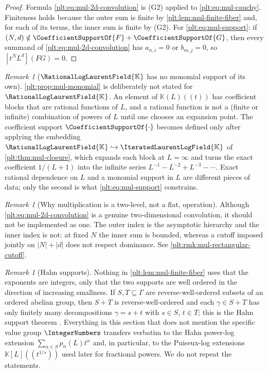 \documentclass[11pt,oneside]{article}
\theoremstyle{plain}
\theoremstyle{definition}
\theoremstyle{remark}
\newtheorem{remark}[theorem]{Remark}
\newcommand{\K}{\mathbb{K}}
\newcommand{\PLrat}{\RationalLogLaurentField{\K}}        %
\newcommand{\PLit}{\IteratedLaurentLogField{\K}}         %
\begin{document}
\begin{proof}
Formula \eqref{plt:eq:mul-2d-convolution} is (G2) applied to
\eqref{plt:eq:mul-cauchy}.  Finiteness holds because the outer sum is finite
by \cref{plt:lem:mul-finite-fiber} and, for each of its terms, the inner sum
is finite by (G2).  For \eqref{plt:eq:mul-support}: if
$(N,d)\notin\CoefficientSupportOf{F}+\CoefficientSupportOf{G}$, then every
summand of \eqref{plt:eq:mul-2d-convolution} has $a_{n,i}=0$ or $b_{m,j}=0$,
so $[t^NL^d](FG)=0$.
\end{proof}

\begin{remark}[$\PLrat$ has no monomial support of its own]
\label{plt:rmk:mul-rat-no-support}
\cref{plt:prop:mul-monomial} is deliberately not stated for $\PLrat$.  An
element of $\K(L)((t))$ has coefficient blocks that are rational functions of
$L$, and a rational function is not a (finite or infinite) combination of
powers of $L$ until one chooses an expansion point.  The coefficient support
$\CoefficientSupportOf{\cdot}$ becomes defined only after applying the
embedding $\PLrat\hookrightarrow\PLit$ of \cref{plt:thm:mul-closure}, which
expands each block at $L=\infty$ and turns the exact coefficient $1/(L+1)$
into the infinite series $L^{-1}-L^{-2}+L^{-3}-\cdots$.  Exact rational
dependence on $L$ and a monomial support in $L$ are different pieces of data;
only the second is what \eqref{plt:eq:mul-support} constrains.
\end{remark}

\begin{remark}[Why multiplication is a two-level, not a flat, operation]
\label{plt:rmk:mul-two-level}
Although \eqref{plt:eq:mul-2d-convolution} is a genuine two-dimensional
convolution, it should not be implemented as one.  The outer index is the
asymptotic hierarchy and the inner index is not: at fixed $N$ the inner sum
is bounded, whereas a cutoff imposed jointly on $|N|+|d|$ does not respect
dominance.  See \cref{plt:rmk:mul-rectangular-cutoff}.
\end{remark}

\begin{remark}[Hahn supports]
\label{plt:rmk:mul-hahn}
Nothing in \cref{plt:lem:mul-finite-fiber} uses that the exponents are
integers, only that the two supports are well ordered in the direction of
increasing smallness.  If $S,T\subseteq\Gamma$ are reverse-well-ordered
subsets of an ordered abelian group, then $S+T$ is reverse-well-ordered and
each $\gamma\in S+T$ has only finitely many decompositions $\gamma=s+t$ with
$s\in S$, $t\in T$; this is the Hahn support theorem
\cite{hahn,edgar-beginners}.  Everything in this section that does not
mention the specific value group $\IntegerNumbers$ transfers verbatim to the
Hahn power-log extension $\sum_{\alpha\in S}p_\alpha(L)t^\alpha$ and, in
particular, to the Puiseux-log extensions $\K[L]((t^{1/s}))$ used later for
fractional powers.  We do not repeat the statements.
\end{remark}
\end{document}
